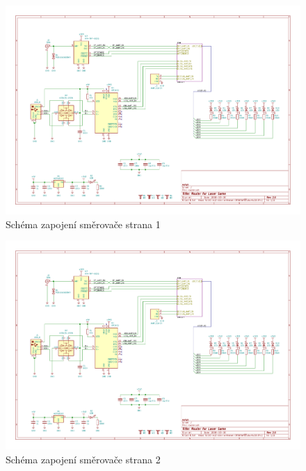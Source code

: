 \begin{landscape}
    \begin{figure}[h]
        \centering
        \includegraphics[page=1, height=\textwidth]{sch/router}
        \caption{Schéma zapojení směrovače strana 1}
    \end{figure}
\end{landscape}
\begin{landscape}
    \begin{figure}[h]
        \centering
        \includegraphics[page=2, height=\textwidth]{sch/router}
        \caption{Schéma zapojení směrovače strana 2}
    \end{figure}
\end{landscape}



